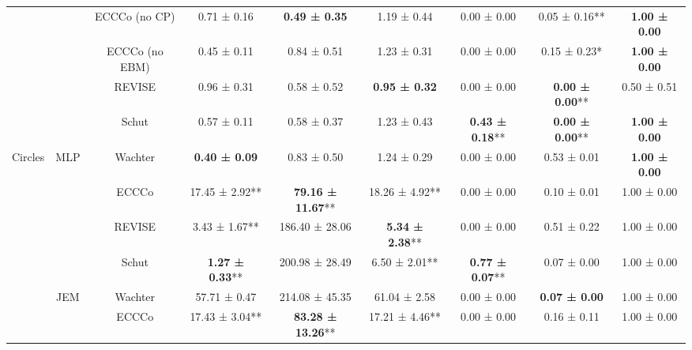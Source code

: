 \begin{table}
{\begin{tabular}[t]{ccccccccc}
 &  & ECCCo (no CP) & 0.71 ± 0.16\hphantom{*}\hphantom{*} & \textbf{0.49 ± 0.35}\hphantom{*}\hphantom{*} & 1.19 ± 0.44\hphantom{*}\hphantom{*} & 0.00 ± 0.00\hphantom{*}\hphantom{*} & 0.05 ± 0.16** & \textbf{1.00 ± 0.00}\hphantom{*}\hphantom{*}\\

 &  & ECCCo (no EBM) & 0.45 ± 0.11\hphantom{*}\hphantom{*} & 0.84 ± 0.51\hphantom{*}\hphantom{*} & 1.23 ± 0.31\hphantom{*}\hphantom{*} & 0.00 ± 0.00\hphantom{*}\hphantom{*} & 0.15 ± 0.23*\hphantom{*} & \textbf{1.00 ± 0.00}\hphantom{*}\hphantom{*}\\

 &  & REVISE & 0.96 ± 0.31\hphantom{*}\hphantom{*} & 0.58 ± 0.52\hphantom{*}\hphantom{*} & \textbf{0.95 ± 0.32}\hphantom{*}\hphantom{*} & 0.00 ± 0.00\hphantom{*}\hphantom{*} & \textbf{0.00 ± 0.00}** & 0.50 ± 0.51\hphantom{*}\hphantom{*}\\

 &  & Schut & 0.57 ± 0.11\hphantom{*}\hphantom{*} & 0.58 ± 0.37\hphantom{*}\hphantom{*} & 1.23 ± 0.43\hphantom{*}\hphantom{*} & \textbf{0.43 ± 0.18}** & \textbf{0.00 ± 0.00}** & \textbf{1.00 ± 0.00}\hphantom{*}\hphantom{*}\\

\multirow[t]{-12}{*}{\centering\arraybackslash Circles} & \multirow[t]{-6}{*}{\centering\arraybackslash MLP} & Wachter & \textbf{0.40 ± 0.09}\hphantom{*}\hphantom{*} & 0.83 ± 0.50\hphantom{*}\hphantom{*} & 1.24 ± 0.29\hphantom{*}\hphantom{*} & 0.00 ± 0.00\hphantom{*}\hphantom{*} & 0.53 ± 0.01\hphantom{*}\hphantom{*} & \textbf{1.00 ± 0.00}\hphantom{*}\hphantom{*}\\
\cmidrule{1-9}
 &  & ECCCo & 17.45 ± 2.92** & \textbf{79.16 ± 11.67}** & 18.26 ± 4.92** & 0.00 ± 0.00\hphantom{*}\hphantom{*} & 0.10 ± 0.01\hphantom{*}\hphantom{*} & 1.00 ± 0.00\hphantom{*}\hphantom{*}\\

 &  & REVISE & 3.43 ± 1.67** & 186.40 ± 28.06\hphantom{*}\hphantom{*} & \textbf{5.34 ± 2.38}** & 0.00 ± 0.00\hphantom{*}\hphantom{*} & 0.51 ± 0.22\hphantom{*}\hphantom{*} & 1.00 ± 0.00\hphantom{*}\hphantom{*}\\

 &  & Schut & \textbf{1.27 ± 0.33}** & 200.98 ± 28.49\hphantom{*}\hphantom{*} & 6.50 ± 2.01** & \textbf{0.77 ± 0.07}** & 0.07 ± 0.00\hphantom{*}\hphantom{*} & 1.00 ± 0.00\hphantom{*}\hphantom{*}\\

 & \multirow[t]{-4}{*}{\centering\arraybackslash JEM} & Wachter & 57.71 ± 0.47\hphantom{*}\hphantom{*} & 214.08 ± 45.35\hphantom{*}\hphantom{*} & 61.04 ± 2.58\hphantom{*}\hphantom{*} & 0.00 ± 0.00\hphantom{*}\hphantom{*} & \textbf{0.07 ± 0.00}\hphantom{*}\hphantom{*} & 1.00 ± 0.00\hphantom{*}\hphantom{*}\\
\cmidrule{2-9}
 &  & ECCCo & 17.43 ± 3.04** & \textbf{83.28 ± 13.26}** & 17.21 ± 4.46** & 0.00 ± 0.00\hphantom{*}\hphantom{*} & 0.16 ± 0.11\hphantom{*}\hphantom{*} & 1.00 ± 0.00\hphantom{*}\hphantom{*}\\


\end{tabular}}
\end{table}
